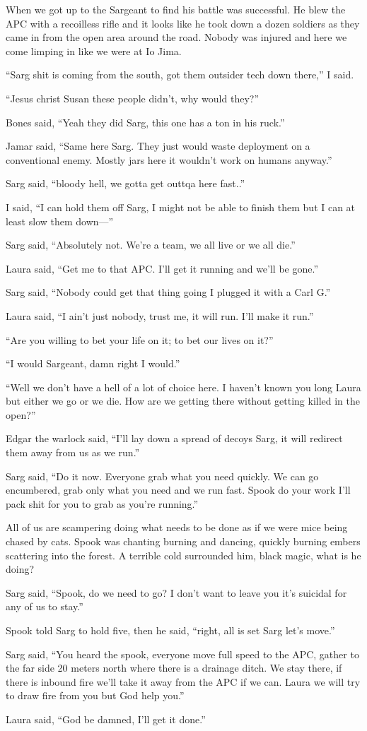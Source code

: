 When we got up to the Sargeant to find his battle was successful. He blew the APC with a recoilless rifle and it looks like he took down a dozen soldiers as they came in from the open area around the road. Nobody was injured and here we come limping in like we were at Io Jima.

``Sarg shit is coming from the south, got them outsider tech down there,'' I said.

``Jesus christ Susan these people didn't, why would they?''

Bones said, ``Yeah they did Sarg, this one has a ton in his ruck.''

Jamar said, ``Same here Sarg. They just would waste deployment on a conventional enemy. Mostly jars here it wouldn't work on humans anyway.''

Sarg said, ``bloody hell, we gotta get outtqa here fast..''

I said, ``I can hold them off Sarg, I might not be able to finish them but I can at least slow them down---''

Sarg said, ``Absolutely not. We're a team, we all live or we all die.''

Laura said, ``Get me to that APC. I'll get it running and we'll be gone.''

Sarg said, ``Nobody could get that thing going I plugged it with a Carl G.''

Laura said, ``I ain't just nobody, trust me, it will run. I'll make it run.''

``Are you willing to bet your life on it; to bet our lives on it?''

``I would Sargeant, damn right I would.''

``Well we don't have a hell of a lot of choice here. I haven't known you long Laura but either we go or we die. How are we getting there  without getting killed in the open?''

Edgar the warlock said, ``I'll lay down a spread of decoys Sarg, it will redirect them away from us as we run.''

Sarg said, ``Do it now. Everyone grab what you need quickly. We can go encumbered, grab only what you need and we run fast. Spook do your work I'll pack shit for you to grab as you're running.''

All of us are scampering doing what needs to be done as if we were mice being chased by cats. Spook was chanting burning and dancing, quickly burning embers scattering into the forest. A terrible cold surrounded him, black magic, what is he doing?

Sarg said, ``Spook, do we need to go? I don't want to leave you it's suicidal for any of us to stay.''

Spook told Sarg to hold five, then he said, ``right, all is set Sarg let's move.''

Sarg said, ``You heard the spook, everyone move full speed to the APC, gather to the far side 20 meters north where there is a drainage ditch. We stay there, if there is inbound fire we'll take it away from the APC if we can. Laura we will try to draw fire from you but God help you.''

Laura said, ``God be damned, I'll get it done.''


